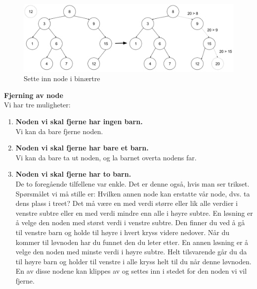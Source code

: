 \begin{figure}[H]
\includegraphics[scale=0.45]{images/innsettingnode}
\centering %
\caption{Sette inn node i binærtre}
\label{fig:innsettingnode}
\end{figure}

\noindent\textbf{Fjerning av node}\\
Vi har tre muligheter:
\begin{enumerate}
    \item \textbf{Noden vi skal fjerne har ingen barn.}\\ Vi kan da bare fjerne noden.
    \item \textbf{Noden vi skal fjerne har bare et barn.}\\ Vi kan da bare ta ut noden, og la barnet overta nodens far.
    \item \textbf{Noden vi skal fjerne har to barn.}\\ De to foregående tilfellene var enkle. Det er denne også, hvis man ser trikset. Spørsmålet vi må stille er: Hvilken annen node kan erstatte vår node, dvs. ta dens plass i treet? Det må være en med verdi større eller lik alle verdier i venstre subtre eller en med verdi mindre enn alle i høyre subtre. \newline \newline
    En løsning er å velge den noden med størst verdi i venstre subtre. Den finner du ved å gå til venstre barn og holde til høyre i hvert kryss videre nedover. Når du kommer til løvnoden har du funnet den du leter etter. \newline\newline
    En annen løsning er å velge den noden med minste verdi i høyre subtre. Helt tilsvarende går du da til høyre barn og holder til venstre i alle kryss helt til du når denne løvnoden.
    \newline\newline
    En av disse nodene kan klippes av og settes inn i stedet for den noden vi vil fjerne.
\end{enumerate}

